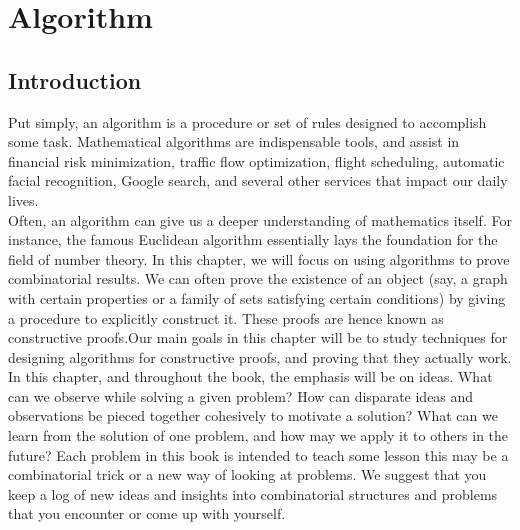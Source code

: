 \documentclass[a4paper,11pt]{book}
\begin{document}
\chapter{Algorithm}
\section{Introduction}
Put simply, an algorithm is a procedure or set of rules designed to accomplish some task. Mathematical algorithms are indispensable tools, and assist in financial risk minimization, traffic flow optimization, flight scheduling, automatic facial recognition, Google search, and several other services that impact our daily lives.\\

Often, an algorithm can give us a deeper understanding of
mathematics itself. For instance, the famous Euclidean algorithm essentially lays the foundation for the field of number theory. In this chapter, we will focus on using algorithms to prove combinatorial results. We can often prove the existence of an object (say, a graph with certain properties or a family of sets satisfying certain conditions) by giving a procedure to explicitly construct it. These proofs are hence known as constructive proofs.Our main goals in this chapter will be to study techniques for designing algorithms for constructive proofs, and proving that they actually work.\\

In this chapter, and throughout the book, the emphasis will be
on ideas. What can we observe while solving a given problem?
How can disparate ideas and observations be pieced together
cohesively to motivate a solution? What can we learn from the
solution of one problem, and how may we apply it to others in the future? Each problem in this book is intended to teach some lesson this may be a combinatorial trick or a new way of looking at problems. We suggest that you keep a log of new ideas and insights into combinatorial structures and problems that you encounter or come up with yourself.
\end{document}
